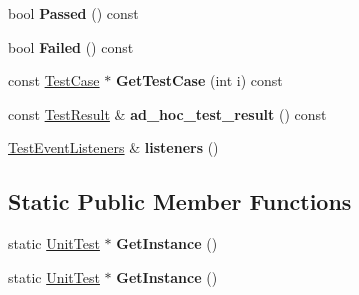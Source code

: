 \begin{DoxyCompactItemize}
\item 
\hypertarget{classtesting_1_1_unit_test_a4ef49e958702bf741e7eaa4864e28a48}{}bool {\bfseries Passed} () const \label{classtesting_1_1_unit_test_a4ef49e958702bf741e7eaa4864e28a48}

\item 
\hypertarget{classtesting_1_1_unit_test_ad7711156d07d6037d8f497e5c385f78d}{}bool {\bfseries Failed} () const \label{classtesting_1_1_unit_test_ad7711156d07d6037d8f497e5c385f78d}

\item 
\hypertarget{classtesting_1_1_unit_test_a7967986c217975d4de70739d28b4109d}{}const \hyperlink{classtesting_1_1_test_case}{Test\+Case} $\ast$ {\bfseries Get\+Test\+Case} (int i) const \label{classtesting_1_1_unit_test_a7967986c217975d4de70739d28b4109d}

\item 
\hypertarget{classtesting_1_1_unit_test_ab4ecadf87d00bc67d15553e2998ef81d}{}const \hyperlink{classtesting_1_1_test_result}{Test\+Result} \& {\bfseries ad\+\_\+hoc\+\_\+test\+\_\+result} () const \label{classtesting_1_1_unit_test_ab4ecadf87d00bc67d15553e2998ef81d}

\item 
\hypertarget{classtesting_1_1_unit_test_a1b7387b0b3daa2433ed6b685027bf285}{}\hyperlink{classtesting_1_1_test_event_listeners}{Test\+Event\+Listeners} \& {\bfseries listeners} ()\label{classtesting_1_1_unit_test_a1b7387b0b3daa2433ed6b685027bf285}

\end{DoxyCompactItemize}
\subsection*{Static Public Member Functions}
\begin{DoxyCompactItemize}
\item 
\hypertarget{classtesting_1_1_unit_test_af254e2e695471eb9f128bc556bae3668}{}static \hyperlink{classtesting_1_1_unit_test}{Unit\+Test} $\ast$ {\bfseries Get\+Instance} ()\label{classtesting_1_1_unit_test_af254e2e695471eb9f128bc556bae3668}

\item 
\hypertarget{classtesting_1_1_unit_test_af254e2e695471eb9f128bc556bae3668}{}static \hyperlink{classtesting_1_1_unit_test}{Unit\+Test} $\ast$ {\bfseries Get\+Instance} ()\label{classtesting_1_1_unit_test_af254e2e695471eb9f128bc556bae3668}

\end{DoxyCompactItemize}
